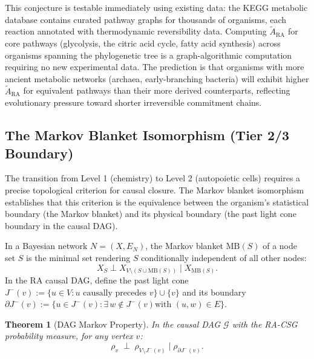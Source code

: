 \documentclass[11pt,a4paper]{article}
\newtheorem{theorem}{Theorem}[section]
\theoremstyle{remark}
\newcommand{\MB}{\mathrm{MB}}
\newcommand{\GG}{\mathcal{G}}
\begin{document}
This conjecture is testable immediately using existing data: the KEGG
metabolic database contains curated pathway graphs for thousands of
organisms, each reaction annotated with thermodynamic reversibility data.
Computing $\tilde{A}_{\mathrm{RA}}$ for core pathways (glycolysis, the
citric acid cycle, fatty acid synthesis) across organisms spanning the
phylogenetic tree is a graph-algorithmic computation requiring no new
experimental data. The prediction is that organisms with more ancient
metabolic networks (archaea, early-branching bacteria) will exhibit higher
$\tilde{A}_{\mathrm{RA}}$ for equivalent pathways than their more derived
counterparts, reflecting evolutionary pressure toward shorter irreversible
commitment chains.

\subsection{The Markov Blanket Isomorphism (Tier 2/3 Boundary)}
\label{sec:markov_rahc}

The transition from Level 1 (chemistry) to Level 2 (autopoietic cells) requires
a precise topological criterion for causal closure. The Markov blanket isomorphism
establishes that this criterion is the equivalence between the organism's
statistical boundary (the Markov blanket) and its physical boundary (the past
light cone boundary in the causal DAG).

In a Bayesian network $N = (X, E_N)$, the Markov blanket $\MB(S)$ of a node set
$S$ is the minimal set rendering $S$ conditionally independent of all other nodes:
\begin{equation}
  X_S \perp X_{V \setminus (S \cup \MB(S))} \mid X_{\MB(S)}.
\end{equation}
In the RA causal DAG, define the past light cone
$J^-(v) := \{u \in V : u \text{ causally precedes } v\} \cup \{v\}$ and its
boundary $\partial J^-(v) := \{u \in J^-(v) : \exists\, w \notin J^-(v) \text{
with } (u,w) \in E\}$.

\begin{theorem}[DAG Markov Property]
\label{thm:dag-markov}
In the causal DAG $\GG$ with the RA-CSG probability measure, for any vertex $v$:
\begin{equation}
  \rho_v \;\perp\; \rho_{V \setminus J^-(v)} \;\Big|\; \rho_{\partial J^-(v)}.
\end{equation}
\end{theorem}
\end{document}
